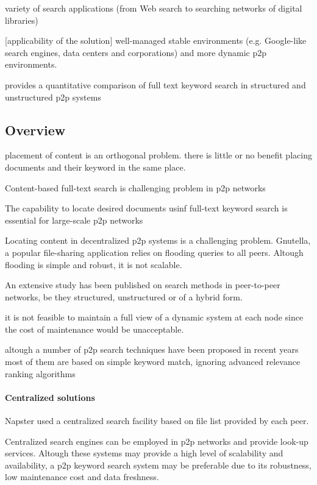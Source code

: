 variety of search applications (from Web search to searching networks of digital libraries)

[applicability of the solution] well-managed stable environments (e.g. Google-like search engines, data centers and corporations) and more dynamic p2p environments.

\cite{YDR+06} provides a quantitative comparison of full text keyword search in structured and unstructured p2p systems

\subsection{Overview}
placement of content is an orthogonal problem. there is little or no benefit placing documents and their keyword in the same place.

Content-based full-text search is challenging problem in p2p networks

The capability to locate desired documents usinf full-text keyword search is essential for large-scale p2p networks

Locating content in decentralized p2p systems is a challenging problem. Gnutella, a popular file-sharing application relies on flooding queries to all peers. Altough flooding is simple and robust, it is not scalable.

An extensive study \cite{risson2006srt, andro2004} has been published on search methods in peer-to-peer networks, be they structured, unstructured or of a hybrid form.

it is not feasible to maintain a full view of a dynamic system at each node since the cost of maintenance would be unacceptable.

altough a number of p2p search techniques have been proposed in recent years most of them are based on simple keyword match, ignoring advanced relevance ranking algorithms

\paragraph{Centralized solutions} Napster used a centralized search facility based on file list provided by each peer.

Centralized search engines can be employed in p2p networks and provide look-up services. Altough these systems may provide a high level of scalability and availability, a p2p keyword search system may be preferable due to its robustness, low maintenance cost and data freshness.


